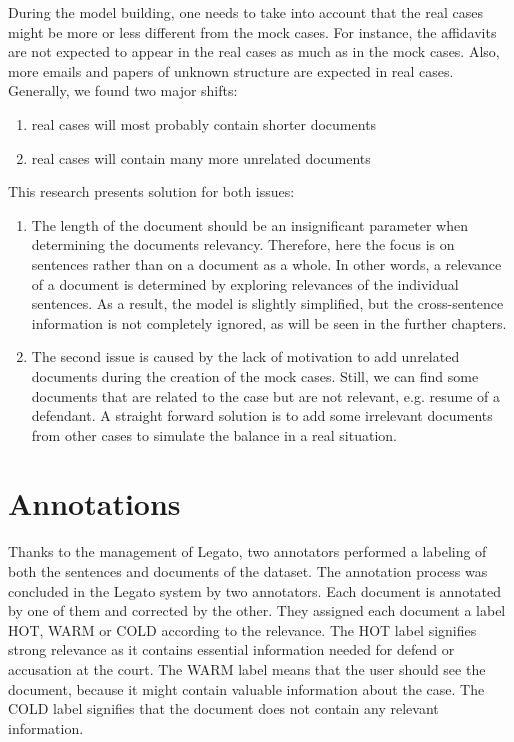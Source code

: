 \documentclass[
  digital, %
  notable,   %
  nolof,     %
  nolot,     %
]{fithesis3}
\begin{document}
During the model building, one needs to take into account that the real cases might be more or less different from the mock cases.
For instance, the affidavits are not expected to appear in the real cases as much as in the mock cases.
Also, more emails and papers of unknown structure are expected in real cases.
Generally, we found two major shifts: 
\begin{enumerate}
\item real cases will most probably contain shorter documents
\item real cases will contain many more unrelated documents
\end{enumerate}
This research presents solution for both issues:
\begin{enumerate}
\item 
The length of the document should be an insignificant parameter when determining the documents relevancy.
Therefore, here the focus is on sentences rather than on a document as a whole.
In other words, a relevance of a document is determined by exploring relevances of the individual sentences.
As a result, the model is slightly simplified, but the cross-sentence information is not completely ignored, as will be seen in the further chapters.

\item
The second issue is caused by the lack of motivation to add unrelated documents during the creation of the mock cases.
Still, we can find some documents that are related to the case but are not relevant, e.g. resume of a defendant.
A straight forward solution is to add some irrelevant documents from other cases to simulate the balance in a real situation.

\end{enumerate}

\section{Annotations}
Thanks to the management of Legato, two annotators performed a labeling of both the sentences and documents of the dataset.
The annotation process was concluded in the Legato system by two annotators.
Each document is annotated by one of them and corrected by the other.
They assigned each document a label HOT, WARM or COLD according to the relevance.
The HOT label signifies strong relevance as it contains essential information needed for defend or accusation at the court.
The WARM label means that the user should see the document, because it might contain valuable information about the case.
The COLD label signifies that the document does not contain any relevant information.
\end{document}
